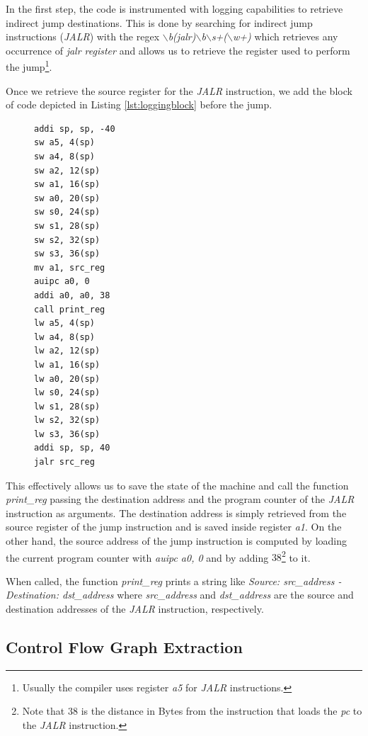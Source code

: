 In the first step, the code is instrumented with logging capabilities to retrieve
indirect jump destinations. This is done by searching for indirect jump
instructions (\textit{JALR}) with the regex \textit{$\backslash$b(jalr)$\backslash$b$\backslash$s+($\backslash$w+)}
which retrieves any occurrence of \textit{jalr register} and allows us to retrieve
the register used to perform the jump\footnote{Usually the compiler uses
register \textit{a5} for \textit{JALR} instructions.}.

Once we retrieve the source register for the \textit{JALR} instruction, we add
the block of code depicted in Listing \ref{lst:loggingblock} before the jump.

\begin{figure}
  \setlength{\intextsep}{0pt}
  \begin{minipage}{0.25\textwidth}
    \begin{lstlisting}[style=Assembly, caption = Logging code block, label={lst:loggingblock}]
addi sp, sp, -40
sw a5, 4(sp)
sw a4, 8(sp)
sw a2, 12(sp)
sw a1, 16(sp)
sw a0, 20(sp)
sw s0, 24(sp)
sw s1, 28(sp)
sw s2, 32(sp)
sw s3, 36(sp)
mv a1, src_reg
auipc a0, 0
addi a0, a0, 38
call print_reg
lw a5, 4(sp)
lw a4, 8(sp)
lw a2, 12(sp)
lw a1, 16(sp)
lw a0, 20(sp)
lw s0, 24(sp)
lw s1, 28(sp)
lw s2, 32(sp)
lw s3, 36(sp)
addi sp, sp, 40
jalr src_reg
 \end{lstlisting}
  \end{minipage}
\end{figure}

This effectively allows us to save the state of the machine and call the function
\textit{print\_reg} passing the destination address and the program counter of
the \textit{JALR} instruction as arguments. The destination address is simply
retrieved from the source register of the jump instruction and is saved inside
register \textit{a1}. On the other hand, the source address of the jump instruction
is computed by loading the current program counter with \textit{auipc a0, 0} and
by adding $38$\footnote{Note that $38$ is the distance in Bytes from the
instruction that loads the \textit{pc} to the \textit{JALR} instruction.} to it.

When called, the function \textit{print\_reg} prints a string like \textit{Source:
src\_address - Destination: dst\_address} where \textit{src\_address} and \textit{dst\_address}
are the source and destination addresses of the \textit{JALR} instruction,
respectively.

\subsection{Control Flow Graph Extraction}
\label{subsec:project_cfgextraction}

